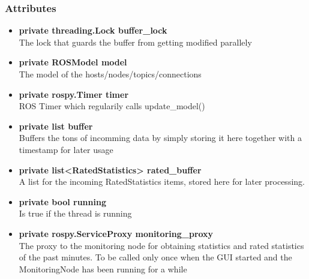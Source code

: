 \subsubsection{Attributes}
\begin{itemize}
  \item \textbf{private threading.Lock buffer\_lock} \\
  The lock that guards the buffer from getting modified parallely
  \item \textbf{private ROSModel model}\\ 
  The model of the hosts/nodes/topics/connections
  \item \textbf{private rospy.Timer timer} \\
  ROS Timer which regularily calls update\_model()
  \item \textbf{private list buffer}\\
  Buffers the tons of incomming data by
  simply storing it here together with a timestamp for later usage
  \item \textbf{private list<RatedStatistics> rated\_buffer}\\ 
  A list for the incoming RatedStatistics items, stored here for later
  processing.
  \item \textbf{private bool running}\\
  Is true if the thread is running
  \item \textbf{private rospy.ServiceProxy monitoring\_proxy}\\ 
  The proxy to the monitoring node for obtaining statistics and rated
  statistics of the past minutes. To be called only once when the GUI started
  and the MonitoringNode has been running for a while
\end{itemize}
